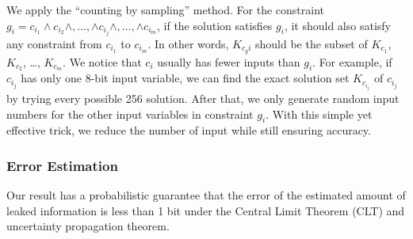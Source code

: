 We apply the ``counting by sampling'' method. For
the constraint $g_{i}= c_{i_1} \land c_{i_2} \land ,\ldots, \land c_{i_j} \land
,\ldots, \land c_{i_m}$, if the solution satisfies $g_{i}$, it should also
satisfy any constraint from $c_{i_1}$ to $c_{i_m}$. In other words, $K_{c_gi}$
should be the subset of $K_{c_1}$, $K_{c_2}$, \ldots , $K_{c_m}$. We notice that
$c_i$ usually has fewer inputs than $g_{i}$. For example, if
$c_{i_j}$ has only one 8-bit input variable, we can find the exact solution set
$K_{c_{i_j}}$ of $c_{i_j}$ by trying every possible 256 solution. After that,
we only generate random input numbers for the other input variables in
constraint $g_{i}$. With this simple yet effective trick, we reduce the number of input
while still ensuring accuracy.




\subsubsection{Error Estimation}
\label{sssec:errest}
Our result has a probabilistic guarantee that the error of the estimated amount of leaked 
information is less than 1 bit under the Central Limit Theorem (CLT) and uncertainty
propagation theorem.

